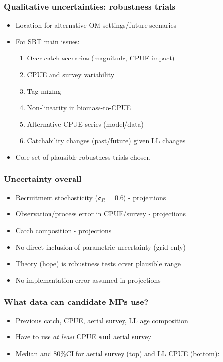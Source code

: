 \documentclass{beamer}
\begin{document}
\begin{frame}
\frametitle{Qualitative uncertainties: robustness trials}
\begin{itemize}
    \item Location for alternative OM settings/future scenarios
    \item For SBT main issues:
        \begin{enumerate}
            \item Over-catch scenarios (magnitude, CPUE impact)
            \item CPUE and survey variability
            \item Tag mixing
            \item Non-linearity in biomass-to-CPUE
            \item Alternative CPUE series (model/data)
            \item Catchability changes (past/future) given LL changes
        \end{enumerate}
    \item Core set of plausible robustness trials chosen
\end{itemize}
\end{frame}
\begin{frame}
\frametitle{Uncertainty overall}
\begin{itemize}
    \item Recruitment stochasticity ($\sigma_R=0.6$) - projections
    \item Observation/process error in CPUE/survey - projections
    \item Catch composition - projections
    \item No direct inclusion of parametric uncertainty (grid only)
    \item Theory (hope) is robustness tests cover plausible range
    \item No implementation error assumed in projections
\end{itemize}
\end{frame}
\begin{frame}
\frametitle{What data can candidate MPs use?}
\begin{itemize}
    \item Previous catch, CPUE, aerial survey, LL age composition
    \item Have to use \textit{at least} CPUE \textbf{and} aerial survey
    \item Median and 80\%CI for aerial survey (top) and LL CPUE (bottom): 
\begin{figure}
\begin{center}
\hspace{-1cm}
\end{center}
\end{figure}
\end{itemize}
\end{frame}
\end{document}
